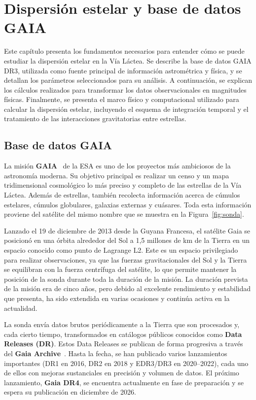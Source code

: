 \chapter{Dispersión estelar y base de datos GAIA}
\label{chap:dispersion}
Este capítulo presenta los fundamentos necesarios para entender cómo se puede estudiar la dispersión estelar en la Vía Láctea.
Se describe la base de datos GAIA DR3, utilizada como fuente principal de información astrométrica y física, y se detallan los parámetros seleccionados para su análisis.
A continuación, se explican los cálculos realizados para transformar los datos observacionales en magnitudes físicas.
Finalmente, se presenta el marco físico y computacional utilizado para calcular la dispersión estelar, incluyendo el esquema de integración temporal y el tratamiento de las interacciones gravitatorias entre estrellas.

\section{Base de datos GAIA}\label{sec:GAIA}

La misión \textbf{GAIA}~\cite{gaia_mission_esa} de la ESA es uno de los proyectos más ambiciosos de la astronomía moderna.
Su objetivo principal es realizar un censo y un mapa tridimensional cosmológico lo más preciso y completo de las estrellas de la Vía Láctea.
Además de estrellas, también recolecta información acerca de cúmulos estelares, cúmulos globulares, galaxias externas y cuásares.
Toda esta información proviene del satélite del mismo nombre que se muestra en la Figura~\ref{fig:sonda}.

Lanzado el 19 de diciembre de 2013 desde la Guyana Francesa, el satélite Gaia se posicionó en una órbita alrededor del Sol a 1,5 millones de km de la Tierra en un espacio conocido como punto de Lagrange L2.
Este es un espacio privilegiado para realizar observaciones, ya que las fuerzas gravitacionales del Sol y la Tierra se equilibran con la fuerza centrífuga del satélite, lo que permite mantener la posición de la sonda durante toda la duración de la misión.
La duración prevista de la misión era de cinco años, pero debido al excelente rendimiento y estabilidad que presenta, ha sido extendida en varias ocasiones y continúa activa en la actualidad.

La sonda envía datos brutos periódicamente a la Tierra que son procesados y, cada cierto tiempo, transformados en catálogos públicos conocidos como \textbf{Data Releases (DR)}.
Estos Data Releases se publican de forma progresiva a través del \textbf{Gaia Archive}~\cite{gaia_archive}.
Hasta la fecha, se han publicado varios lanzamientos importantes (DR1 en 2016, DR2 en 2018 y EDR3/DR3 en 2020–2022), cada uno de ellos con mejoras sustanciales en precisión y volumen de datos.
El próximo lanzamiento, \textbf{Gaia DR4}, se encuentra actualmente en fase de preparación y se espera su publicación en diciembre de 2026.

